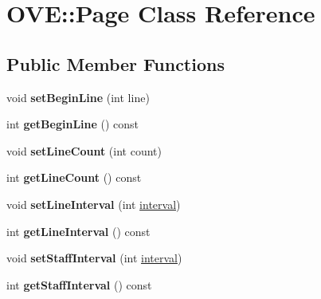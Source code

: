 \hypertarget{class_o_v_e_1_1_page}{}\section{O\+VE\+:\+:Page Class Reference}
\label{class_o_v_e_1_1_page}
\subsection*{Public Member Functions}
\begin{DoxyCompactItemize}
\item 
\mbox{\label{class_o_v_e_1_1_page_ae1d19e1f12b384b83995a6ebbe036dc9}} 
void {\bfseries set\+Begin\+Line} (int line)
\item 
\mbox{\label{class_o_v_e_1_1_page_a30b27cc501cbb2f455fe8dfa3dd7c9e7}} 
int {\bfseries get\+Begin\+Line} () const
\item 
\mbox{\label{class_o_v_e_1_1_page_aa134ba57ea2807c06f9c7b274727c9f2}} 
void {\bfseries set\+Line\+Count} (int count)
\item 
\mbox{\label{class_o_v_e_1_1_page_aeed115b68bc2d6e7fa6dae7b637efd3e}} 
int {\bfseries get\+Line\+Count} () const
\item 
\mbox{\label{class_o_v_e_1_1_page_a5fa6c0fecf5e66727cb1c7bc917b693d}} 
void {\bfseries set\+Line\+Interval} (int \hyperlink{class_interval}{interval})
\item 
\mbox{\label{class_o_v_e_1_1_page_a6e76167a11f6eb74863d4c4d66afdd70}} 
int {\bfseries get\+Line\+Interval} () const
\item 
\mbox{\label{class_o_v_e_1_1_page_a546911ec65b8e8aa0c0f78ed6ab44f1e}} 
void {\bfseries set\+Staff\+Interval} (int \hyperlink{class_interval}{interval})
\item 
\mbox{\label{class_o_v_e_1_1_page_aa6b0686759756f94b06bd9b0720250e3}} 
int {\bfseries get\+Staff\+Interval} () const
\item 
\mbox{\label{class_o_v_e_1_1_page_a0bdde05380ec3b2d9b00d38c49933b76}} 

\end{DoxyCompactItemize}
